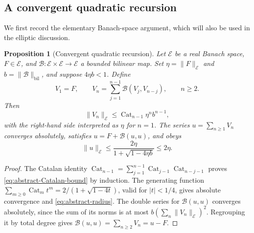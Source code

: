 \documentclass[11pt,a4paper,twoside]{article}
\numberwithin{equation}{section}
\newtheorem{proposition}[theorem]{Proposition}
\theoremstyle{definition}
\theoremstyle{remark}
\begin{document}
\subsection{A convergent quadratic recursion}
\label{subsec:abstract-recursion}
We first record the elementary Banach-space argument, which will
also be used in the elliptic discussion.
\begin{proposition}[Convergent quadratic recursion]
\label{prop:abstract-recursion}
Let \(\mathcal E\) be a real Banach space, \(F\in\mathcal E\),
and \(\mathcal B:\mathcal E\times\mathcal E\to\mathcal E\)
a bounded bilinear map. Set \(\eta=\|F\|_{\mathcal E}\) and
\(b=\|\mathcal B\|_{\mathrm{bil}}\), and suppose \(4\eta b<1\).
Define
\[
V_1=F,\qquad V_n=\sum_{j=1}^{n-1}\mathcal B(V_j,V_{n-j}),
\qquad n\ge2.
\]
Then
\begin{equation}\label{eq:abstract-Catalan-bound}
\|V_n\|_{\mathcal E}
\le\operatorname{Cat}_{n-1}\eta^n b^{n-1},
\end{equation}
with the right-hand side interpreted as \(\eta\) for \(n=1\).
The series \(u=\sum_{n\ge1}V_n\) converges absolutely, satisfies
\(u=F+\mathcal B(u,u)\), and obeys
\begin{equation}\label{eq:abstract-radius}
\|u\|_{\mathcal E}
\le\frac{2\eta}{1+\sqrt{1-4\eta b}}\le2\eta.
\end{equation}
\end{proposition}
\begin{proof}
The Catalan identity
\(\operatorname{Cat}_{n-1}
=\sum_{j=1}^{n-1}\operatorname{Cat}_{j-1}\operatorname{Cat}_{n-j-1}\)
proves \eqref{eq:abstract-Catalan-bound} by induction. The generating
function \(\sum_{m\ge0}\operatorname{Cat}_m t^m
=2/(1+\sqrt{1-4t})\), valid for \(|t|<1/4\), gives absolute
convergence and \eqref{eq:abstract-radius}.
The double series for \(\mathcal B(u,u)\) converges absolutely,
since the sum of its norms is at most
\(b(\sum_n\|V_n\|_{\mathcal E})^2\). Regrouping it by total
degree gives \(\mathcal B(u,u)=\sum_{n\ge2}V_n=u-F\).
\end{proof}
\end{document}
